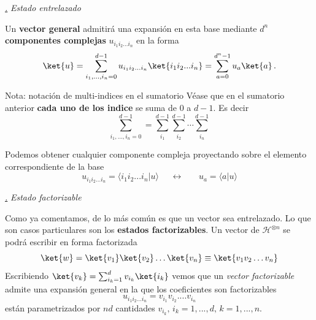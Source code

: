 \documentclass[a4paper,11pt]{book} %
\numberwithin{equation}{chapter}
\newcommand{\braket}[2]{\langle #1|#2\rangle}
\def\subsubiContadorIt{\par\addtocounter{subsubsection}{1}\underline{\it\thesubsubsection.}\hskip0.5cm \setcounter{subsubsubsectionIt}{0}}
\newcommand{\SubsubiIt}[1]{
		\subsubiContadorIt \textit{#1}
	}
\newcounter{subsubsubsectionIt}[subsubsection]
\begin{document}
			\SubsubiIt{Estado entrelazado}

Un \textbf{vector general} admitirá una expansión en esta base mediante $d^n$ \textbf{componentes complejas}
$u_{i_1 i_2...i_n}$ en la forma
	\begin{equation}
	\ket{u} = \sum_{i_1,...,i_n=0}^{d-1} u_{i_1i_2...i_n} \ket{i_1i_2...i_n} = \sum_{a=0}^{d^n-1} u_a\ket{a}\, .
	\end{equation}

	\begin{mybox_blue}{Nota: notación de multi-indices en el sumatorio}
	Véase que en el sumatorio anterior \textbf{cada uno de los indice} se suma de 0 a $d-1$. Es decir
		\begin{equation}
		\sum_{i_1,...,i_n=0}^{d-1} = \sum_{i_1}^{d-1} \sum_{i_2}^{d-1} \cdots \sum_{i_n}^{d-1}
		\end{equation}	
	\end{mybox_blue}	
	
Podemos obtener cualquier componente compleja proyectando sobre el elemento correspondiente de la base
	\begin{equation}
	u_{i_1i_2...i_n} = \braket{i_1 i_2... i_n}{u}~~~~~~\leftrightarrow~~~~~~~~u_a = \braket{a}{u}
	\end{equation}


			\SubsubiIt{Estado factorizable}

Como ya comentamos, de lo más común es que un vector sea entrelazado. Lo que son casos particulares son los \textbf{estados factorizables}. Un vector de $\mathcal{H}^{\otimes n}$ se podrá escribir en forma factorizada
	\begin{equation}
	\ket{w} = \ket{v_1}\ket{v_2}\ldots\ket{v_n} \equiv \ket{v_1 v_2 \ldots v_n}
	\end{equation}
Escribiendo $\ket{v_k} = \sum_{i_k=1}^d v_{i_k}\ket{i_k}$ vemos que un \textit{vector factorizable} admite una expansión general en la que los coeficientes son factorizables
	\begin{equation}
	u_{i_1i_2...i_n}  = v_{i_1} v_{i_2}.... v_{i_n}
	\end{equation}
están parametrizados por $nd$ cantidades $v_{i_k}, \, i_k=1,...,d, \, k=1,...,n$.
\end{document}
